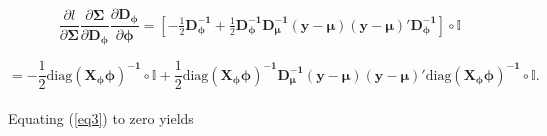 \documentclass[useAMS,referee]{biom}
\begin{document}
\begin{equation*}
\begin{array}{l}
\dfrac{\partial l}{\partial \boldsymbol{\Sigma}} \dfrac{\partial \boldsymbol{\Sigma}}{\partial \mathbf{D_\phi}}\dfrac{\partial \mathbf{D_\phi}}{\partial \boldsymbol{\phi}}=[-\frac{1}{2}\mathbf{ D_\phi^{-1}}+\frac{1}{2}\mathbf{ D_\phi^{-1}D_\mu^{-1}}(\mathbf{y}-\boldsymbol{\mu})(\mathbf{y}-\boldsymbol{\mu})'\mathbf{ D_\phi^{-1}}]\circ \mathbb{I}\\~\\     
\end{array}
\end{equation*}
\begin{equation}\label{eq3}
= -\frac{1}{2}\mbox{diag}\mathbf{ (X_\phi \boldsymbol{\phi})^{-1}}\circ \mathbb{I}+\frac{1}{2}\mbox{diag}\mathbf{ (X_\phi \boldsymbol{\phi})^{-1}D_\mu^{-1}}(\mathbf{y}-\boldsymbol{\mu})(\mathbf{y}-\boldsymbol{\mu})'\mbox{diag}\mathbf{( X_\phi \boldsymbol{\phi})^{-1}}\circ \mathbb{I}.
\end{equation}\\
Equating (\ref{eq3}) to zero yields
\end{document}
